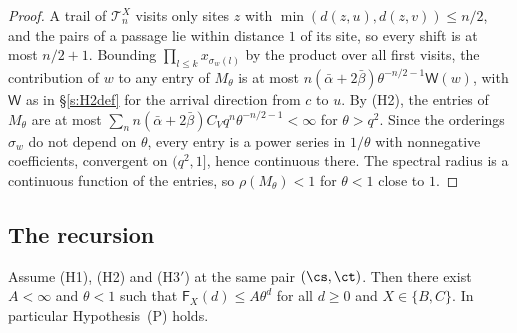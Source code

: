 \begin{proof}
A trail of $\mathcal T^X_n$ visits only sites $z$ with $\min(d(z, u), d(z, v)) \le n/2$, and the pairs of a passage lie within distance $1$ of its site, so every shift is at most $n/2 + 1$. Bounding $\prod_{l \le k} x_{\sigma_w(l)}$ by the product over all first visits, the contribution of $w$ to any entry of $M_\theta$ is at most $n (\bar\alpha + 2\bar\beta) \theta^{-n/2 - 1} \mathsf W(w)$, with $\mathsf W$ as in \S\ref{s:H2def} for the arrival direction from $c$ to $u$. By (H2), the entries of $M_\theta$ are at most $\sum_n n (\bar\alpha + 2\bar\beta) C_V q^n \theta^{-n/2 - 1} < \infty$ for $\theta > q^2$. Since the orderings $\sigma_w$ do not depend on $\theta$, every entry is a power series in $1/\theta$ with nonnegative coefficients, convergent on $(q^2, 1]$, hence continuous there. The spectral radius is a continuous function of the entries, so $\rho(M_\theta) < 1$ for $\theta < 1$ close to $1$.
\end{proof}

\subsection{The recursion}\label{s:therecursion}

\begin{theorem}\label{t:rec}
Assume (H1), (H2) and (H3$'$) at the same pair $(\cs, \ct)$. Then there exist $A < \infty$ and $\theta < 1$ such that $\mathsf F_X(d) \le A \theta^d$ for all $d \ge 0$ and $X \in \{B, C\}$. In particular Hypothesis~(P) holds.
\end{theorem}


